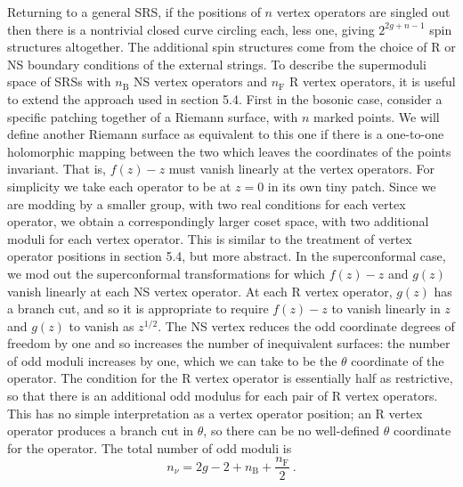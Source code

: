 Returning to a general SRS, if the positions of $n$ vertex operators are singled out then there is a nontrivial closed curve circling each, less one, giving $2^{2g+n-1}$ spin structures altogether. The additional spin structures come from the choice of R or NS boundary conditions of the external strings. To describe the supermoduli space of SRSs with $n_{\mathrm{B}}$ NS vertex operators and $n_{\mathrm{F}}$ R vertex operators, it is useful to extend the approach used in section 5.4. First in the bosonic case, consider a specific patching together of a Riemann surface, with $n$ marked points. We will define another Riemann surface as equivalent to this one if there is a one-to-one holomorphic mapping between the two which leaves the coordinates of the points invariant. That is, $f(z) - z$ must vanish linearly at the vertex operators. For simplicity we take each operator to be at $z = 0$ in its own tiny patch. Since we are modding by a smaller group, with two real conditions for each vertex operator, we obtain a correspondingly larger coset space, with two additional moduli for each vertex operator. This is similar to the treatment of vertex operator positions in section 5.4, but more abstract. In the superconformal case, we mod out the superconformal transformations for which $f(z) - z$ and $g(z)$ vanish linearly at each NS vertex operator. At each R vertex operator, $g(z)$ has a branch cut, and so it is appropriate to require $f(z) - z$ to vanish linearly in $z$ and $g(z)$ to vanish as $z^{1/2}$. The NS vertex reduces the odd coordinate degrees of freedom by one and so increases the number of inequivalent surfaces: the number of odd moduli increases by one, which we can take to be the $\theta$ coordinate of the operator. The condition for the R vertex operator is essentially half as restrictive, so that there is an additional odd modulus for each pair of R vertex operators. This has no simple interpretation as a vertex operator position; an R vertex operator produces a branch cut in $\theta$, so there can be no well-defined $\theta$ coordinate for the operator. The total number of odd moduli is
\begin{equation}
	n_{\nu} = 2g - 2 + n_{\mathrm{B}} + \frac{n_{\mathrm{F}}}{2} \:. \label{12.5.23}
\end{equation}

